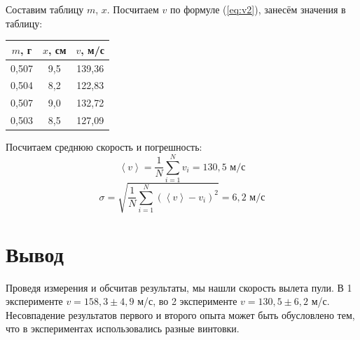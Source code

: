 \documentclass[a4paper, 12pt]{article}
\begin{document}
			Составим таблицу $m$, $x$. Посчитаем $v$ по формуле (\ref{eq:v2}), занесём значения в таблицу:
			\begin{center}
				\begin{tabular}{|c|c|c|}
					\hline
					$m$, г & $x$, см & $v$, м/с \\ \hline
					0,507  & 9,5     & 139,36   \\ \hline
					0,504  & 8,2     & 122,83   \\ \hline
					0,507  & 9,0     & 132,72   \\ \hline
					0,503  & 8,5     & 127,09   \\ \hline
				\end{tabular}
			\end{center}

			Посчитаем среднюю скорость и погрешность:
			\[
				\left<v\right> = \frac{1}{N}\sum_{i = 1}^N v_i = 130,5 \text{ м/с}
			\]
			\[
				\sigma = \sqrt{\frac{1}{N}\sum_{i = 1}^N (\left<v\right> - v_i)^2} = 6,2 \text{ м/с}
			\]

	\section{Вывод}

	Проведя измерения и обсчитав результаты, мы нашли скорость вылета пули. В 1 эксперименте $v = 158,3 \pm 4,9$ м/с, во 
	2 эксперименте $v = 130,5 \pm 6,2$ м/с. Несовпадение результатов первого и второго опыта может быть обусловлено тем,
	что в экспериментах использовались разные винтовки.
\end{document}
